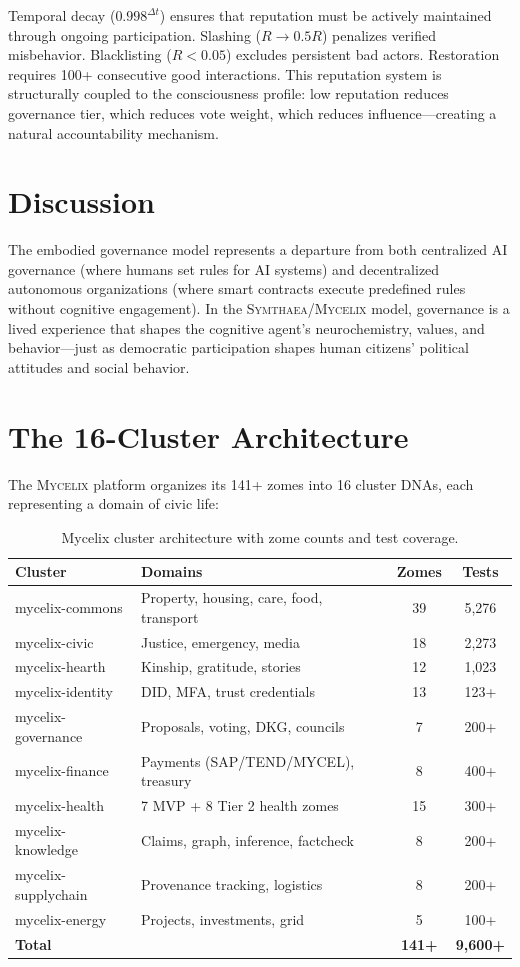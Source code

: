 \documentclass[12pt]{book}
\newcommand{\symthaea}{\textsc{Symthaea}}
\newcommand{\mycelix}{\textsc{Mycelix}}
\begin{document}
Temporal decay ($0.998^{\Delta t}$) ensures that reputation must be actively maintained through ongoing participation. Slashing ($R \to 0.5R$) penalizes verified misbehavior. Blacklisting ($R < 0.05$) excludes persistent bad actors. Restoration requires 100+ consecutive good interactions. This reputation system is structurally coupled to the consciousness profile: low reputation reduces governance tier, which reduces vote weight, which reduces influence---creating a natural accountability mechanism.

\section{Discussion}

The embodied governance model represents a departure from both centralized AI governance (where humans set rules for AI systems) and decentralized autonomous organizations (where smart contracts execute predefined rules without cognitive engagement). In the \symthaea{}/\mycelix{} model, governance is a lived experience that shapes the cognitive agent's neurochemistry, values, and behavior---just as democratic participation shapes human citizens' political attitudes and social behavior.

\section{The 16-Cluster Architecture}

The \mycelix{} platform organizes its 141+ zomes into 16 cluster DNAs, each representing a domain of civic life:

\begin{table}[H]
\centering
\caption{Mycelix cluster architecture with zome counts and test coverage.}
\label{tab:mycelix-clusters}
\begin{tabular}{llcc}
\toprule
\textbf{Cluster} & \textbf{Domains} & \textbf{Zomes} & \textbf{Tests} \\
\midrule
mycelix-commons & Property, housing, care, food, transport & 39 & 5,276 \\
mycelix-civic & Justice, emergency, media & 18 & 2,273 \\
mycelix-hearth & Kinship, gratitude, stories & 12 & 1,023 \\
mycelix-identity & DID, MFA, trust credentials & 13 & 123+ \\
mycelix-governance & Proposals, voting, DKG, councils & 7 & 200+ \\
mycelix-finance & Payments (SAP/TEND/MYCEL), treasury & 8 & 400+ \\
mycelix-health & 7 MVP + 8 Tier 2 health zomes & 15 & 300+ \\
mycelix-knowledge & Claims, graph, inference, factcheck & 8 & 200+ \\
mycelix-supplychain & Provenance tracking, logistics & 8 & 200+ \\
mycelix-energy & Projects, investments, grid & 5 & 100+ \\
\midrule
\textbf{Total} & & \textbf{141+} & \textbf{9,600+} \\
\bottomrule
\end{tabular}
\end{table}
\end{document}
